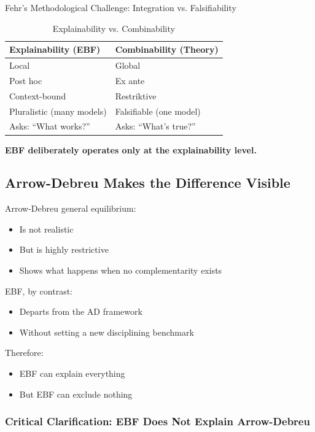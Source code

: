 \begin{chapter}{Fehr's Methodological Challenge: Integration vs. Falsifiability}
\begin{table}[h]
\centering
\caption{Explainability vs. Combinability}
\label{tab:explain-combine}
\renewcommand{\arraystretch}{1.4}
\begin{tabular}{@{}p{5.5cm}p{5.5cm}@{}}
\toprule
\textbf{Explainability (EBF)} & \textbf{Combinability (Theory)} \\
\midrule
Local & Global \\
Post hoc & Ex ante \\
Context-bound & Restriktive \\
Pluralistic (many models) & Falsifiable (one model) \\
Asks: ``What works?'' & Asks: ``What's true?'' \\
\bottomrule
\end{tabular}
\end{table}

\textbf{EBF deliberately operates only at the explainability level.}

\subsection{Arrow-Debreu Makes the Difference Visible}

Arrow-Debreu general equilibrium:
\begin{itemize}[noitemsep]
    \item Is not realistic
    \item But is highly restrictive
    \item Shows what happens when no complementarity exists
\end{itemize}

EBF, by contrast:
\begin{itemize}[noitemsep]
    \item Departs from the AD framework
    \item Without setting a new disciplining benchmark
\end{itemize}

Therefore:
\begin{itemize}[noitemsep]
    \item EBF can explain everything
    \item But EBF can exclude nothing
\end{itemize}

\subsubsection{Critical Clarification: EBF Does Not Explain Arrow-Debreu}


\end{chapter}
